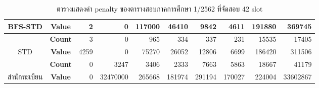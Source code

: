 \begin{table}[]
{\begin{tabular}{@{}ccrrrrrrrr@{}}
    \multirow{-2}{*}{BFS-STD}                    & \textbf{Value}                        & 2                           & 0                        & 117000                       & 46410                        & 9842                         & 4611                        & 191880                        & 369745                        \\ \midrule
    {\color[HTML]{FE0000} }                      & {\color[HTML]{FE0000} \textbf{Count}} & {\color[HTML]{FE0000} 3}    & {\color[HTML]{FE0000} 0} & {\color[HTML]{FE0000} 965}   & {\color[HTML]{FE0000} 334}   & {\color[HTML]{FE0000} 337}   & {\color[HTML]{FE0000} 231}  & {\color[HTML]{FE0000} 15535}  & {\color[HTML]{FE0000} 17405}  \\ \cmidrule(l){2-10} 
    \multirow{-2}{*}{{\color[HTML]{FE0000} STD}} & {\color[HTML]{FE0000} \textbf{Value}} & {\color[HTML]{FE0000} 4259} & {\color[HTML]{FE0000} 0} & {\color[HTML]{FE0000} 75270} & {\color[HTML]{FE0000} 26052} & {\color[HTML]{FE0000} 12806} & {\color[HTML]{FE0000} 6699} & {\color[HTML]{FE0000} 186420} & {\color[HTML]{FE0000} 311506} \\ \midrule
                                                 & \textbf{Count}                        & 0                           & 3247                     & 3406                         & 2333                         & 7663                         & 5863                        & 18667                         & 41179                         \\ \cmidrule(l){2-10} 
    \multirow{-2}{*}{สำนักทะเบียน}                  & \textbf{Value}                        & 0                           & 32470000                 & 265668                       & 181974                       & 291194                       & 170027                      & 224004                        & 33602867                      \\ \bottomrule
    \end{tabular}%
    }
    \caption{ตารางแสดงค่า penalty ของตารางสอบภาคการศึกษา 1/2562 ที่จัดสอบ 42 slot}
    \label{tab:result_table_162}
\end{table}
